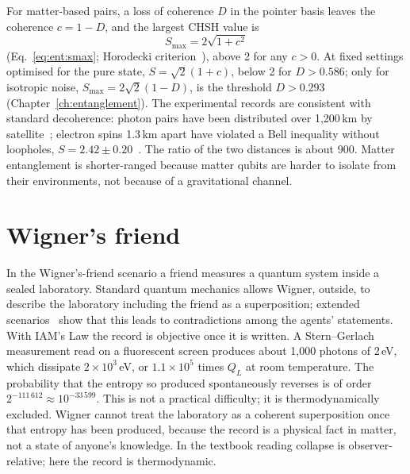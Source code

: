 For matter-based pairs, a loss of coherence $D$ in the pointer basis leaves the coherence $c=1-D$, and the largest CHSH value is
\begin{equation}
S_{\max}=2\sqrt{1+c^2}\label{eq:mp_smax}
\end{equation}
(Eq.~\ref{eq:ent:smax}; Horodecki criterion~\cite{Horodecki1995}), above 2 for any $c>0$. \derived{} At fixed settings optimised for the pure state,
$S=\sqrt2(1+c)$, below 2 for $D>0.586$; only for isotropic noise, $S_{\max}=2\sqrt2(1-D)$, is the threshold $D>0.293$
(Chapter~\ref{ch:entanglement}). \calc{} The experimental records are consistent with standard decoherence: photon pairs have been distributed over
1,200\,km by satellite~\cite{Yin2017}; electron spins 1.3\,km apart have violated a Bell inequality without loopholes, $S=2.42\pm0.20$~\cite{Hensen2015}.
\observed{} The ratio of the two distances is about 900. Matter entanglement is shorter-ranged because matter qubits are harder to isolate from their
environments, not because of a gravitational channel.

\section{Wigner's friend}\label{sec:mp_wigner}
In the Wigner's-friend scenario a friend measures a quantum system inside a sealed laboratory. Standard quantum mechanics allows Wigner, outside, to
describe the laboratory including the friend as a superposition; extended scenarios~\cite{FrauchigerRenner2018} show that this leads to contradictions
among the agents' statements. With IAM's Law the record is objective once it is written. A Stern--Gerlach measurement read on a fluorescent screen
produces about 1,000 photons of 2\,eV, which dissipate $2\times10^3$\,eV, or $1.1\times10^5$ times $Q_L$ at room temperature. \calc{} The probability
that the entropy so produced spontaneously reverses is of order $2^{-111\,612}\approx10^{-33\,599}$. \calc{} This is not a practical difficulty; it is
thermodynamically excluded. Wigner cannot treat the laboratory as a coherent superposition once that entropy has been produced, because the record is a
physical fact in matter, not a state of anyone's knowledge. In the textbook reading collapse is observer-relative; here the record is thermodynamic.
\interp

